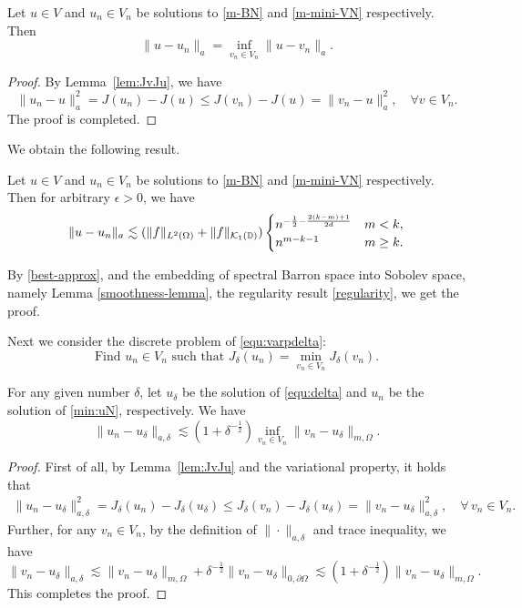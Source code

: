 \begin{theorem}\label{thm:best} Let $u\in V$ and $u_n\in V_n$ be solutions to
  \eqref{m-BN} and \eqref{m-mini-VN} respectively.   Then
  \begin{equation}
    \label{best-approx}
\|u-u_n\|_a=\inf_{v_n\in V_n}\|u-v_n\|_a.
  \end{equation}
\end{theorem}
\begin{proof}
By  Lemma~\ref{lem:JvJu}, we have
$$
\|u_n-u\|_a^2=J(u_n)-J(u)\le J(v_n)-J(u)=\|v_n-u\|_a^2,\quad\forall v\in V_n.
$$
The proof is completed.
\end{proof}
We obtain the following result.
\begin{theorem}
Let $u\in V$ and $u_n\in V_n$ be solutions to
\eqref{m-BN} and \eqref{m-mini-VN} respectively.  Then for arbitrary $\epsilon>0$, we have
\begin{equation}\label{error:N}
\|u-u_n\|_a \lesssim 
(\|f\|_{L^2(\Omega)}+\|f\|_{\mathcal{K}_1(\mathbb{D})})
\begin{cases}
n^{-{1\over 2}-{2(k-m)+1\over 2d}}&m< k,
\\
n^{m-k-1}& m\ge k.
\end{cases} 
\end{equation}
\end{theorem}
By \eqref{best-approx},  and the embedding of spectral Barron space  into Sobolev space, namely Lemma \ref{smoothness-lemma}, the regularity result \eqref{regularity}, we get the proof. 

Next we consider the discrete problem of \eqref{equ:varpdelta}:
\begin{equation}
\label{min:uN}
\mbox{Find $u_n\in V_n$ such that } J_\delta(u_n)=\min_{v_n\in V_n}J_\delta(v_n).
\end{equation}

\begin{lemma}
For any given number $\delta$, let $u_\delta$ be the solution of \eqref{equ:delta} and
  $u_n$ be the solution of \eqref{min:uN}, respectively. We have
  \begin{equation}
  \label{eq:1}
\|u_n-u_\delta\|_{a,\delta} \lesssim (1+ \delta^{-\frac12})  \inf_{v_n\in
  V_n} \|v_n-u_\delta\|_{m,\Omega}. 
  \end{equation}
\end{lemma}
\begin{proof}
First of all, by Lemma~\ref{lem:JvJu} and the variational property, it holds that
\begin{align}\label{eq:min}
\|u_n-u_\delta\|_{a,\delta}^2=J_{\delta}(u_n)-J_{\delta}(u_{\delta})\le J_{\delta}(v_n)-J_{\delta}(u_{\delta})
=\|v_n-u_\delta\|_{a,\delta}^2, \quad \forall\,v_n\in V_n.
\end{align}
Further, for any $v_n\in V_n$, by the definition of $\|\cdot\|_{a,\delta}$ and trace inequality, we have 
$$
\|v_n-u_\delta\|_{a,\delta}\lesssim  \|v_n-u_\delta\|_{m,\Omega}+\delta^{-\frac12} \|v_n-u_\delta\|_{0,\partial\Omega}\lesssim (1+\delta^{-\frac12})\|v_n-u_\delta\|_{m,\Omega}.
$$
This completes the proof. 
\end{proof}

